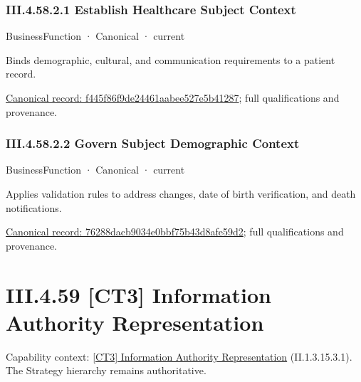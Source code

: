\subsubsection*{III.4.58.2.1 Establish Healthcare Subject Context}
\label{navigation:III.4.58.2.1}

\label{element:f445f86f9de24461aabee527e5b41287}
{\small BusinessFunction · Canonical · current}\par

Binds demographic, cultural, and communication requirements to a patient record.


{\footnotesize \href{../../../../continuum/business/business-function/f445f86f9de24461aabee527e5b41287.md}{Canonical record: f445f86f9de24461aabee527e5b41287}; full qualifications and provenance.}\par
\subsubsection*{III.4.58.2.2 Govern Subject Demographic Context}
\label{navigation:III.4.58.2.2}

\label{element:76288dacb9034e0bbf75b43d8afe59d2}
{\small BusinessFunction · Canonical · current}\par

Applies validation rules to address changes, date of birth verification, and death notifications.


{\footnotesize \href{../../../../continuum/business/business-function/76288dacb9034e0bbf75b43d8afe59d2.md}{Canonical record: 76288dacb9034e0bbf75b43d8afe59d2}; full qualifications and provenance.}\par
\section*{III.4.59 [CT3] Information Authority Representation}
\label{navigation:III.4.59}

{\small Capability context: \hyperref[element:8c850faafb334f97a81a0b4cd8fdb65f]{[CT3] Information Authority Representation} (II.1.3.15.3.1). The Strategy hierarchy remains authoritative.}\par
